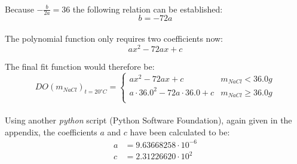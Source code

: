 \documentclass[a4paper]{article}
\begin{document}
\paragraph*{}
Because $-\frac{b}{2a} = 36$ the following relation can be established:
$$b = -72 a$$

\paragraph*{}
The polynomial function only requires two coefficients now:
$$a x^2 - 72 a x + c$$

The final fit function would therefore be:
$$DO(m_{NaCl})_{t = \si{20 \degree C}} = 
\begin{cases}
  a x^2 - 72 a x + c & m_{NaCl} < 36.0 \si{g} \\
  a \cdot 36.0^2 - 72 a \cdot 36.0 + c & m_{NaCl} \geq 36.0 \si{g} \\
\end{cases}
$$

\paragraph*{}
Using another \textit{python} script (Python Software Foundation), again given
in the appendix, the coefficients $a$ and $c$ have been calculated to be:
\begin{align*}
  a &= 9.63668258 \cdot 10^{-6} \\
  c &= 2.31226620 \cdot 10^{2}
\end{align*}
\end{document}
